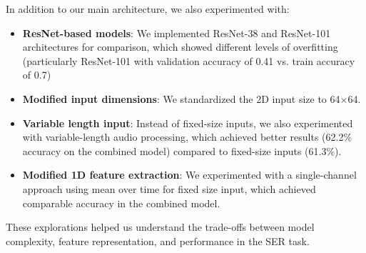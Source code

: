 In addition to our main architecture, we also experimented with:

\begin{itemize}
    \item \textbf{ResNet-based models}: We implemented ResNet-38 and ResNet-101 architectures for comparison, which showed different levels of overfitting (particularly ResNet-101 with validation accuracy of 0.41 vs. train accuracy of 0.7)
    
    \item \textbf{Modified input dimensions}: We standardized the 2D input size to 64×64.
    
    \item \textbf{Variable length input}: Instead of fixed-size inputs, we also experimented with variable-length audio processing, which achieved better results (62.2\% accuracy on the combined model) compared to fixed-size inputs (61.3\%).
    
    \item \textbf{Modified 1D feature extraction}: We experimented with a single-channel approach using mean over time for fixed size input, which achieved comparable accuracy in the combined model.
\end{itemize}

These explorations helped us understand the trade-offs between model complexity, feature representation, and performance in the SER task. 